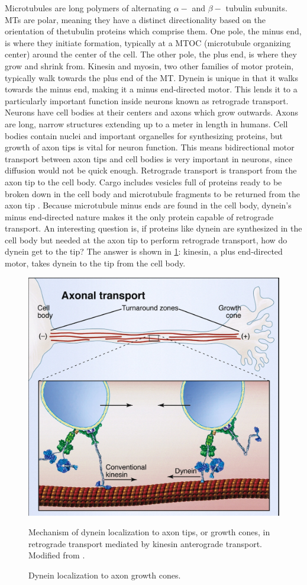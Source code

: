 \documentclass[10pt]{article} %
\begin{document}
Microtubules are long polymers of alternating $\alpha-$ and $\beta-$ tubulin subunits. MTs are polar, meaning they have a distinct directionality based on the orientation of thetubulin proteins which comprise them. One pole, the minus end, is where they initiate formation, typically at a MTOC (microtubule organizing center) around the center of the cell. The other pole, the plus end, is where they grow and shrink from. Kinesin and myosin, two other families of motor protein, typically walk towards the plus end of the MT. Dynein is unique in that it walks towards the minus end, making it a minus end-directed motor. This lends it to a particularly important function inside neurons known as retrograde transport.\\

Neurons have cell bodies at their centers and axons which grow outwards. Axons are long, narrow structures extending up to a meter in length in humans. Cell bodies contain nuclei and important organelles for synthesizing proteins, but growth of axon tips is vital for neuron function. This means bidirectional motor transport between axon tips and cell bodies is very important in neurons, since diffusion would not be quick enough. Retrograde transport is transport from the axon tip to the cell body. Cargo includes vesicles full of proteins ready to be broken down in the cell body and microtubule fragments to be returned from the axon tip \cite{neuroanatomy}. Because microtubule minus ends are found in the cell body, dynein's minus end-directed nature makes it the only protein capable of retrograde transport. An interesting question is, if proteins like dynein are synthesized in the cell body but needed at the axon tip to perform retrograde transport, how do dynein get to the tip? The answer is shown in \ref{retrograde-transport}: kinesin, a plus end-directed motor, takes dynein to the tip from the cell body.\\

\begin{figure}[h]
  \centering
  \includegraphics[width=.65\textwidth,keepaspectratio]{../../figures/retrograde_transport.jpg}
  \caption{Dynein localization to axon growth cones.}{Mechanism of dynein localization to axon tips, or growth cones, in retrograde transport mediated by kinesin anterograde transport. Modified from \cite{valetoolbox}.}
  \label{retrograde-transport}
\end{figure}
\end{document}
